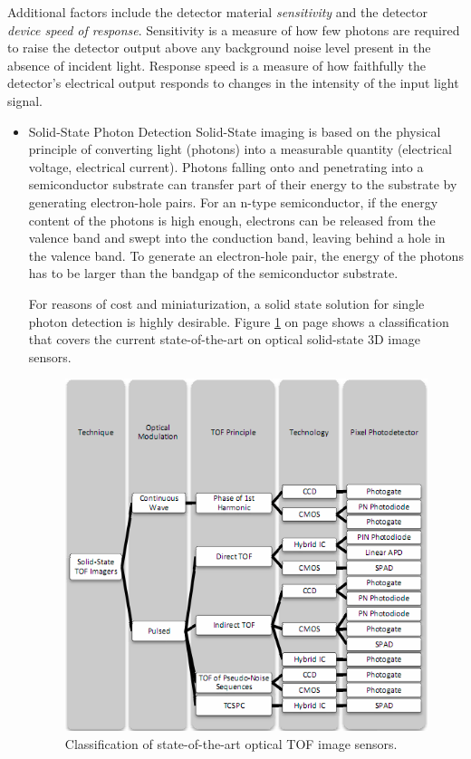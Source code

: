 Additional factors include the detector material \textit{sensitivity} and the detector \textit{device speed of response}. Sensitivity is a measure of how few photons are required to raise the detector output above any background noise level present in the absence of incident light. Response speed is a measure of how faithfully the detector's electrical output responds to changes in the intensity of the input light signal.
\begin{itemize}
	\item Solid-State Photon Detection
Solid-State imaging is based on the physical principle of converting light (photons) into a measurable quantity (electrical voltage, electrical current). Photons falling onto and penetrating into a semiconductor substrate can transfer part of their energy to the substrate by generating electron-hole pairs. For an n-type semiconductor, if the energy content of the photons is high enough, electrons can be released from the valence band and swept into the conduction band, leaving behind a hole in the valence band. To generate an electron-hole pair, the energy of the photons has to be larger than the bandgap of the semiconductor substrate.\cite{photogrammetry}

For reasons of cost and miniaturization, a solid state solution for single photon detection is highly desirable. Figure \ref{fig:intro_receiver1} on page \pageref{fig:intro_receiver1} shows a classification that covers the current state-of-the-art on optical solid-state 3D image sensors. 

\begin{figure}[ht!]
\centering
\includegraphics[scale = 1]{chapters/img/intro_receiver1.png}
\caption{Classification of state-of-the-art optical \ac{TOF} image sensors.}
\label{fig:intro_receiver1}
\end{figure}


\end{itemize}
